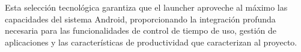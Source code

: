 Esta selección tecnológica garantiza que el launcher aproveche al máximo las capacidades del sistema Android, proporcionando la integración profunda necesaria para las funcionalidades de control de tiempo de uso, gestión de aplicaciones y las características de productividad que caracterizan al proyecto.